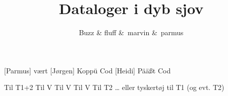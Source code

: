 \documentclass[a4paper]{article}
\title{Dataloger i dyb sjov}
\author{Buzz \& fluff \&\ marvin \&\ parmus}
\begin{document}
\maketitle

\begin{roles}
[Parmus] vært
[Jørgen] Koppü Cod
[Heidi] Pää\ss t Cod
\end{roles}

\begin{props}
   Til T1+2
   Til V
   Til V
   Til V
   Til T2
   \ldots{} eller tyskertøj til T1 (og evt. T2)
\end{props}
\end{document}
